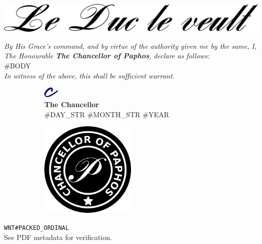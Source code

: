\documentclass[varwidth=true,border=50pt]{standalone}
\begin{document}
\noindent \includegraphics[width=\textwidth]{le_duc_le_veult}

\vspace{20pt}

\textit{By His Grace's command, and by virtue of the authority given me by the same, I, The Honourable \textbf{The Chancellor of Paphos}, declare as follows:}\\

#BODY\\

\textit{In witness of the above, this shall be sufficient warrant.}

\vspace{20pt}

\begin{figure}
\centering
\begin{subfigure}{.5\textwidth}
    \centering
    \includegraphics[width=20pt]{c}\\
    \vspace{5pt}
    \textbf{The Chancellor}\\
    #DAY_STR #MONTH_STR #YEAR
\end{subfigure}%
\begin{subfigure}{.5\textwidth}
    \centering
    \includegraphics[width=0.5\textwidth]{stamp}
\end{subfigure}%
\end{figure}

\vspace{30pt}

\hfill {\footnotesize \texttt{WNT#PACKED_ORDINAL}}\\

{\tiny See PDF metadata for verification.}
\end{document}
